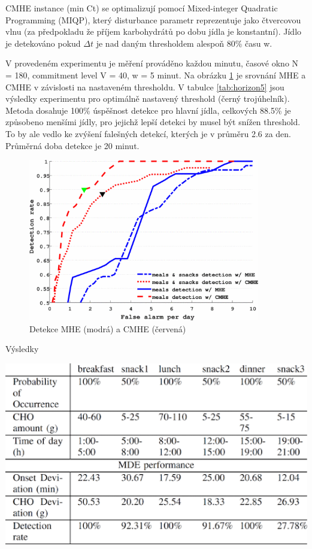 CMHE instance (min Ct) se optimalizují pomocí Mixed-integer Quadratic Programming (MIQP), který disturbance parametr reprezentuje jako čtvercovou vlnu (za předpokladu že příjem karbohydrátů po dobu jídla je konstantní). Jídlo je detekováno pokud $\Delta t$ je nad daným thresholdem alespoň 80\% času w.

V provedeném experimentu je měření prováděno každou minutu, časové okno N = 180, commitment level V = 40, w = 5 minut. Na obrázku \ref{fig:horizon4} je srovnání MHE a CMHE v závislosti na nastaveném thresholdu.  V tabulce \ref{tab:horizon5} jsou výsledky experimentu pro optimálně nastavený threshold (černý trojúhelník). Metoda dosahuje 100\% úspěšnost detekce pro hlavní jídla, celkových 88.5\% je způsobeno menšími jídly, pro jejichž lepší detekci by musel být snížen threshold. To by ale vedlo ke zvýšení falešných detekcí, kterých je v průměru 2.6 za den. Průměrná doba detekce je 20 minut.

\begin{figure}[H]
\caption{Detekce MHE (modrá) a CMHE (červená)}
\label{fig:horizon4}
\centering
\includegraphics[width=0.9\textwidth]{img/analyza/horizon4.png}
\end{figure}

\begin{table}[H]
\caption{Výsledky}
\label{tab:horizon5}
\centering
\includegraphics[width=1\textwidth]{img/analyza/horizon5.png}
\end{table}


